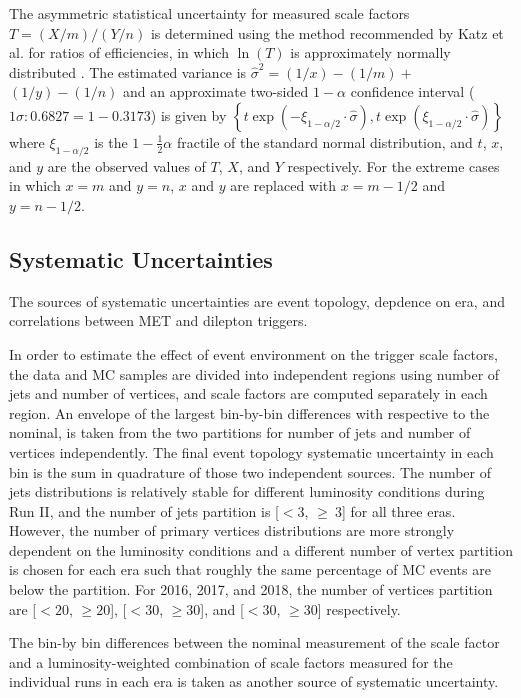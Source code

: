 The asymmetric statistical uncertainty for measured scale factors $T=(X / m) /(Y / n)$ is determined using the method recommended by Katz et al. for ratios of efficiencies, in which $\ln (T)$ is approximately normally distributed \cite{bib:10.2307/2531405}. 
The estimated variance is  $\hat{\sigma}^{2}=(1 / x)-(1 / m)+$ $(1 / y)-(1 / n)$ and an approximate two-sided $1 - \alpha$ confidence interval ($1 \sigma: 0.6827 = 1 - 0.3173$) is given by $\left\{t \exp \left(-\xi_{1-\alpha / 2} \cdot \hat{\sigma}\right), t \exp \left(\xi_{1-\alpha / 2} \cdot \hat{\sigma}\right)\right\}$ where $\xi_{1-\alpha / 2}$ is the $1-\frac{1}{2} \alpha$ fractile of the standard normal distribution, and $t$, $x$, and $y$ are the observed values of $T$, $X$, and $Y$ respectively.  
For the extreme cases in which $x = m$ and $y = n$, $x$ and $y$ are replaced with $x = m - 1/2$ and $y = n - 1/2$.

\subsection{Systematic Uncertainties}
The sources of systematic uncertainties are event topology, depdence on era, and correlations between MET and dilepton triggers.

In order to estimate the effect of event environment on the trigger scale factors, the data and MC samples are divided into independent regions using number of jets and number of vertices, and scale factors are computed separately in each region. 
An envelope of the largest bin-by-bin differences with respective to the nominal, is taken from the two partitions for number of jets and number of vertices independently.
The final event topology systematic uncertainty in each bin is the sum in quadrature of those two independent sources.
The number of jets distributions is relatively stable for different luminosity conditions during Run II, and the number of jets partition is [$< 3$, $\geq\ 3$] for all three eras.
However, the number of primary vertices distributions are more strongly dependent on the luminosity conditions and a different number of vertex partition is chosen for each era such that roughly the same percentage of MC events are below the partition.
For 2016, 2017, and 2018, the number of vertices partition are [$< 20$, $\geq 20$], [$< 30$, $\geq 30$], and [$< 30$, $\geq 30$] respectively.

The bin-by bin differences between the nominal measurement of the scale factor and a luminosity-weighted combination of scale factors measured for the individual runs in each era is taken as another source of systematic uncertainty.


